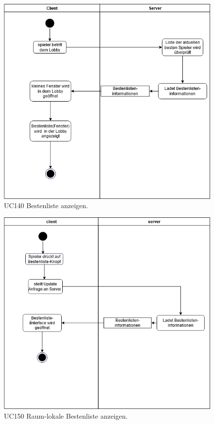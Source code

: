 \begin{figure}[h]
	\centering
	\includegraphics[width=\textwidth]{ad/UC140_Bestenliste.png}
	\caption{UC140 Bestenliste anzeigen.}
\end{figure}

\begin{figure}[h]
	\centering
	\includegraphics[width=\textwidth]{ad/UC 150_raum_lokale_bestenliste_anzeigen.png}
	\caption{UC150 Raum-lokale Bestenliste anzeigen.}
\end{figure}

